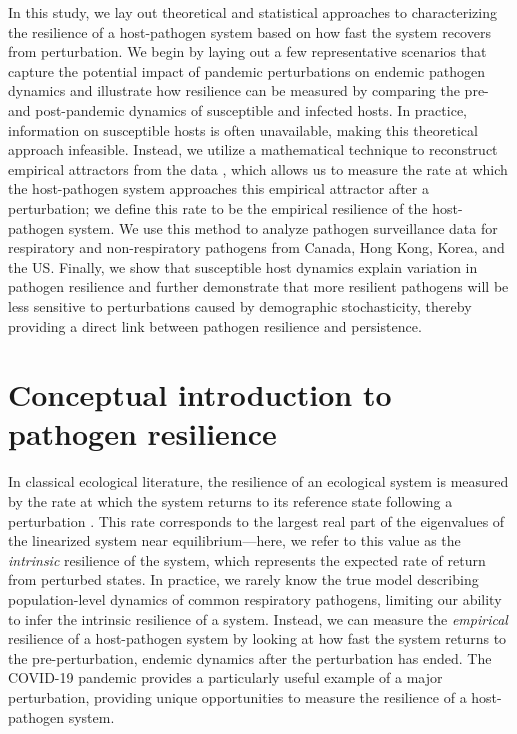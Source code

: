 \documentclass[12pt]{article}
\begin{document}
In this study, we lay out theoretical and statistical approaches to characterizing the resilience of a host-pathogen system based on how fast the system recovers from perturbation.
We begin by laying out a few representative scenarios that capture the potential impact of pandemic perturbations on endemic pathogen dynamics and illustrate how resilience can be measured by comparing the pre- and post-pandemic dynamics of susceptible and infected hosts.
In practice, information on susceptible hosts is often unavailable, making this theoretical approach infeasible.
Instead, we utilize a mathematical technique to reconstruct empirical attractors from the data \citep{takens2006detecting}, which allows us to measure the rate at which the host-pathogen system approaches this empirical attractor after a perturbation;
we define this rate to be the empirical resilience of the host-pathogen system.
We use this method to analyze pathogen surveillance data for respiratory and non-respiratory pathogens from Canada, Hong Kong, Korea, and the US.
Finally, we show that susceptible host dynamics explain variation in pathogen resilience and further demonstrate that more resilient pathogens will be less sensitive to perturbations caused by demographic stochasticity, thereby providing a direct link between pathogen resilience and persistence. 
 
\section*{Conceptual introduction to pathogen resilience}

In classical ecological literature, the resilience of an ecological system is measured by the rate at which the system returns to its reference state following a perturbation \citep{pimm1979structure, neubert1997alternatives,gunderson2000ecological,dakos2022ecological}.
This rate corresponds to the largest real part of the eigenvalues of the linearized system near equilibrium---here, we refer to this value as the \emph{intrinsic} resilience of the system, which represents the expected rate of return from perturbed states.
In practice, we rarely know the true model describing population-level dynamics of common respiratory pathogens, limiting our ability to infer the intrinsic resilience of a system.
Instead, we can measure the \emph{empirical} resilience of a host-pathogen system by looking at how fast the system returns to the pre-perturbation, endemic dynamics after the perturbation has ended.
The COVID-19 pandemic provides a particularly useful example of a major perturbation, providing unique opportunities to measure the resilience of a host-pathogen system.
\end{document}
